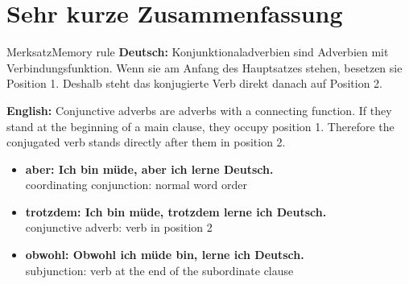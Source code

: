 \documentclass[a4paper,11pt]{article}
\newcommand{\GermanText}[1]{\textbf{Deutsch: }#1\par}
\newcommand{\EnglishText}[1]{{\small\color{SoftGray}\textbf{English: }#1\par}}
\newcommand{\ExampleItem}[2]{\item \textbf{#1}\\{\small\color{SoftGray}#2}}
\begin{document}
    
    \section{Sehr kurze Zusammenfassung}
        
        \begin{grammarentry}{Merksatz}{Memory rule}
            \GermanText{Konjunktionaladverbien sind Adverbien mit Verbindungsfunktion. Wenn sie am Anfang des Hauptsatzes stehen, besetzen sie Position 1. Deshalb steht das konjugierte Verb direkt danach auf Position 2.}
            \EnglishText{Conjunctive adverbs are adverbs with a connecting function. If they stand at the beginning of a main clause, they occupy position 1. Therefore the conjugated verb stands directly after them in position 2.}
            
            \begin{exbox}
                \begin{itemize}
                    \ExampleItem{aber: Ich bin müde, aber ich lerne Deutsch.}{coordinating conjunction: normal word order}
                    \ExampleItem{trotzdem: Ich bin müde, trotzdem lerne ich Deutsch.}{conjunctive adverb: verb in position 2}
                    \ExampleItem{obwohl: Obwohl ich müde bin, lerne ich Deutsch.}{subjunction: verb at the end of the subordinate clause}
                \end{itemize}
            \end{exbox}
        \end{grammarentry}
\end{document}
